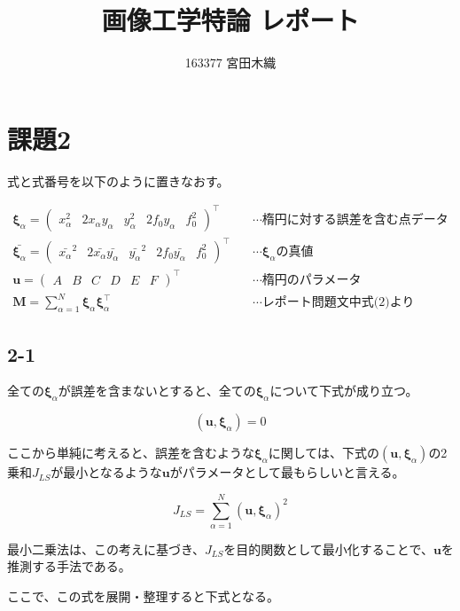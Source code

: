 \documentclass[12pt,a4j]{jsarticle}
\title{画像工学特論 レポート}
\author{163377 宮田木織}
\newcommand{\xa}{x_\alpha}
\newcommand{\ya}{y_\alpha}
\newcommand{\xia}{\bm{\xi}_\alpha}
\begin{document}
  \maketitle %

\section*{課題2}
  式と式番号を以下のように置きなおす。

  \begin{align}
    \xia = \begin{pmatrix}\xa^2 & 2\xa\ya & \ya^2 & 2f_0\ya & f_0^2\end{pmatrix}^\top
     & \quad\cdots\text{楕円に対する誤差を含む点データ} \\
    \bar{\xia} = \begin{pmatrix}\bar{\xa}^2 & 2\bar{\xa}\bar{\ya} & \bar{\ya}^2 & 2f_0\bar{\ya} & f_0^2\end{pmatrix}^\top
     & \quad\cdots\text{$\xia$の真値} \\
    \bm{u} = \begin{pmatrix}A & B & C & D & E & F\end{pmatrix}^\top
     & \quad\cdots\text{楕円のパラメータ} \\
    \bm{M} = \sum_{\alpha = 1}^N \xia \xia^\top
     & \quad\cdots\text{レポート問題文中式(2)より} \label{eq:M}
  \end{align}

  \subsection*{2-1}

  全ての$\xia$が誤差を含まないとすると、全ての$\xia$について下式が成り立つ。

  \begin{equation}
    (\bm{u}, \xia) = 0
  \end{equation}

  ここから単純に考えると、誤差を含むような$\xia$に関しては、下式の$(\bm{u}, \xia)$の2乗和$J_{LS}$が最小となるような$\bm{u}$がパラメータとして最もらしいと言える。

  \begin{equation}
    J_{LS} = \sum_{\alpha = 1}^N (\bm{u}, \xia)^2
  \end{equation}

  最小二乗法は、この考えに基づき、$J_{LS}$を目的関数として最小化することで、$\bm{u}$を推測する手法である。\par
  ここで、この式を展開・整理すると下式となる。
\end{document}
